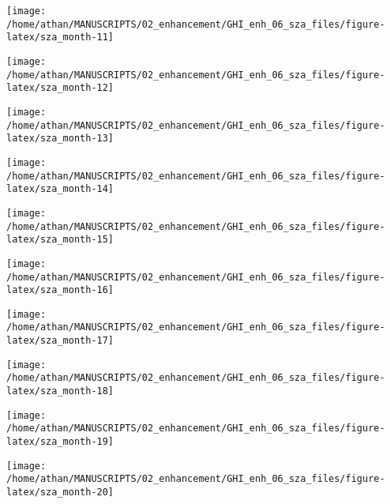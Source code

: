 \documentclass[
  10pt,
  a4paper,oneside]{article}
\begin{document}
\begin{center}\texttt{[image: /home/athan/MANUSCRIPTS/02\_enhancement/GHI\_enh\_06\_sza\_files/figure-latex/sza\_month-11]} \end{center}

\begin{center}\texttt{[image: /home/athan/MANUSCRIPTS/02\_enhancement/GHI\_enh\_06\_sza\_files/figure-latex/sza\_month-12]} \end{center}

\begin{center}\texttt{[image: /home/athan/MANUSCRIPTS/02\_enhancement/GHI\_enh\_06\_sza\_files/figure-latex/sza\_month-13]} \end{center}

\begin{center}\texttt{[image: /home/athan/MANUSCRIPTS/02\_enhancement/GHI\_enh\_06\_sza\_files/figure-latex/sza\_month-14]} \end{center}

\begin{center}\texttt{[image: /home/athan/MANUSCRIPTS/02\_enhancement/GHI\_enh\_06\_sza\_files/figure-latex/sza\_month-15]} \end{center}

\begin{center}\texttt{[image: /home/athan/MANUSCRIPTS/02\_enhancement/GHI\_enh\_06\_sza\_files/figure-latex/sza\_month-16]} \end{center}

\begin{center}\texttt{[image: /home/athan/MANUSCRIPTS/02\_enhancement/GHI\_enh\_06\_sza\_files/figure-latex/sza\_month-17]} \end{center}

\begin{center}\texttt{[image: /home/athan/MANUSCRIPTS/02\_enhancement/GHI\_enh\_06\_sza\_files/figure-latex/sza\_month-18]} \end{center}

\begin{center}\texttt{[image: /home/athan/MANUSCRIPTS/02\_enhancement/GHI\_enh\_06\_sza\_files/figure-latex/sza\_month-19]} \end{center}

\begin{center}\texttt{[image: /home/athan/MANUSCRIPTS/02\_enhancement/GHI\_enh\_06\_sza\_files/figure-latex/sza\_month-20]} \end{center}
\end{document}
